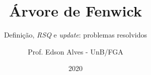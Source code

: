 \title{Árvore de Fenwick}
\subtitle{Definição, \textit{RSQ} e \textit{update}: problemas resolvidos}
\author{Prof. Edson Alves - UnB/FGA}
\date{2020}
